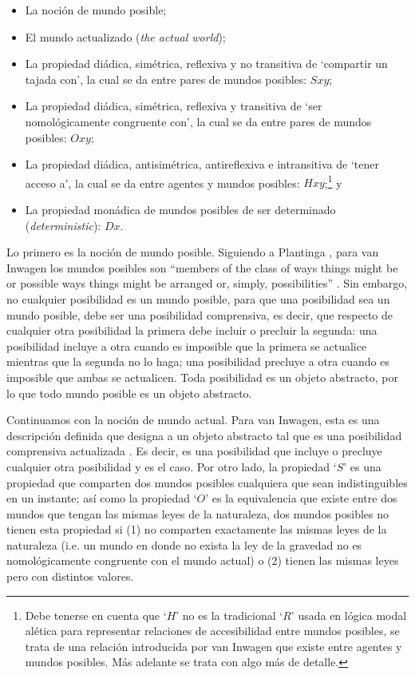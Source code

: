 \documentclass[12pt]{article} %
\begin{document}
\begin{itemize}
	\item La noción de mundo posible;
	\item El mundo actualizado (\textit{the actual world});
	\item La propiedad diádica, simétrica, reflexiva y no transitiva de `compartir un tajada con’, la cual se da entre pares de mundos posibles: $Sxy$;
	\item La propiedad diádica, simétrica, reflexiva y transitiva de ‘ser nomológicamente congruente con’, la cual se da entre pares de mundos posibles: $Oxy$;
	\item La propiedad diádica, antisimétrica, antireflexiva e intransitiva de ‘tener acceso a’, la cual se da entre agentes y mundos posibles: $Hxy$;\footnote{Debe tenerse en cuenta que `$H$' no es la tradicional `$R$' usada en lógica modal alética para representar relaciones de accesibilidad entre mundos posibles, se trata de una relación introducida por van Inwagen que existe entre agentes y mundos posibles. Más adelante se trata con algo más de detalle.} y
	\item La propiedad monádica de mundos posibles de ser determinado (\textit{deterministic}): $Dx$.
\end{itemize}
Lo primero es la noción de mundo posible. Siguiendo a Plantinga \parencite*{Plantinga1974-PLATNO}, para van Inwagen los mundos posibles son ``members of the class of ways things  might be or possible ways things might be arranged or, simply, possibilities'' \parencite[80]{Inwagen1986}. Sin embargo, no cualquier posibilidad es un mundo posible, para que una posibilidad sea un mundo posible, debe ser una posibilidad comprensiva, es decir, que respecto de cualquier otra posibilidad la primera debe incluir o precluir la segunda: una posibilidad incluye a otra cuando es imposible que la primera se actualice mientras que la segunda no lo haga; una posibilidad precluye a otra cuando es imposible que ambas se actualicen. Toda posibilidad es un objeto abstracto, por lo que todo mundo posible es un objeto abstracto.

Continuamos con la noción de mundo actual. Para van Inwagen, esta es una descripción definida que designa a un objeto abstracto tal que es una posibilidad comprensiva actualizada . Es decir, es una posibilidad que incluye o precluye cualquier otra posibilidad y es el caso. Por otro lado, la propiedad `$S$' es una propiedad que comparten dos mundos posibles cualquiera que sean indistinguibles en un instante; así como la propiedad `$O$' es la equivalencia que existe entre dos mundos que tengan las mismas leyes de la naturaleza, dos mundos posibles no tienen esta propiedad si (1) no comparten exactamente las mismas leyes de la naturaleza (i.e. un mundo en donde no exista la ley de la gravedad no es nomológicamente congruente con el mundo actual) o (2) tienen las mismas leyes pero con distintos valores.
\end{document}
